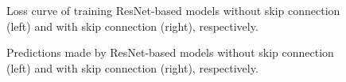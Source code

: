 \documentclass[11pt]{article}
\begin{document}
\begin{figure}[h]
    \centering
    \qquad
    \caption{Loss curve of training ResNet-based models without skip connection (left) and with skip connection (right), respectively.}
    \label{fig:loss-ResnetBasedModel]}
\end{figure}


\begin{figure}[h]
    \centering
    \qquad
    \caption{Predictions made by ResNet-based models without skip connection (left) and with skip connection (right), respectively.}
    \label{fig:pred-ResnetBasedModel]}
\end{figure}
\end{document}
